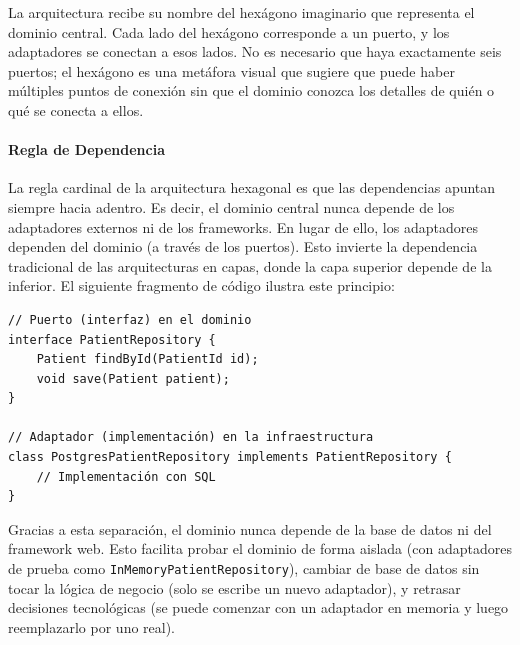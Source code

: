 La arquitectura recibe su nombre del hexágono imaginario que representa el dominio central.
Cada lado del hexágono corresponde a un puerto, y los adaptadores se conectan a esos lados. 
No es necesario que haya exactamente seis puertos; el hexágono es una metáfora visual que 
sugiere que puede haber múltiples puntos de conexión sin que el dominio conozca los detalles 
de quién o qué se conecta a ellos\cite{hexagonalExplained}.

\paragraph{Regla de Dependencia}
La regla cardinal de la arquitectura hexagonal es que las dependencias apuntan siempre hacia 
adentro. Es decir, el dominio central nunca depende de los adaptadores externos ni de los 
frameworks. En lugar de ello, los adaptadores dependen del dominio (a través de los puertos). 
Esto invierte la dependencia tradicional de las arquitecturas en capas, donde la capa superior 
depende de la inferior. El siguiente fragmento de código ilustra este principio:

\begin{verbatim}
// Puerto (interfaz) en el dominio
interface PatientRepository {
    Patient findById(PatientId id);
    void save(Patient patient);
}

// Adaptador (implementación) en la infraestructura
class PostgresPatientRepository implements PatientRepository {
    // Implementación con SQL
}
\end{verbatim}

Gracias a esta separación, el dominio nunca depende de la base de datos ni del 
framework web. Esto facilita probar el dominio de forma aislada (con adaptadores de prueba 
como \texttt{InMemoryPatientRepository}), cambiar de base de datos sin tocar la 
lógica de negocio (solo se escribe un nuevo adaptador), y retrasar decisiones tecnológicas
 (se puede comenzar con un adaptador en memoria y luego reemplazarlo por uno real).

